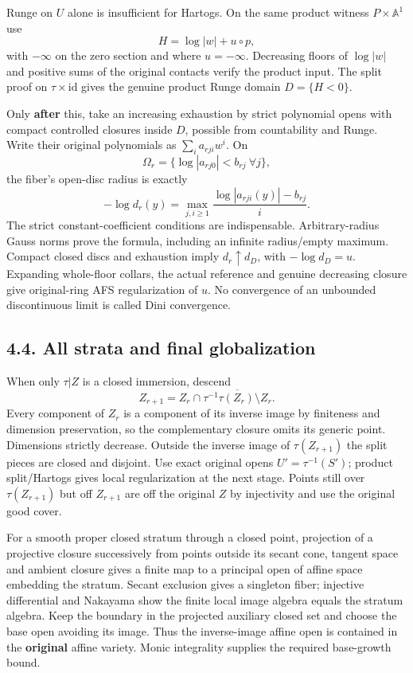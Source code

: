 \documentclass[
  10pt,
]{article}
\begin{document}
Runge on \(U\) alone is insufficient for Hartogs. On the same product
witness \(P\times\mathbb A^1\) use \[H=\log|w|+u\circ p,\] with
\(-\infty\) on the zero section and where \(u=-\infty\). Decreasing
floors of \(\log|w|\) and positive sums of the original contacts verify
the product input. The split proof on \(\tau\times\mathrm{id}\) gives
the genuine product Runge domain \(D=\{H<0\}\).

Only \textbf{after} this, take an increasing exhaustion by strict
polynomial opens with compact controlled closures inside \(D\), possible
from countability and Runge. Write their original polynomials as
\(\sum_i a_{rji}w^i\). On
\[\Omega_r=\{\log|a_{rj0}|<b_{rj}\ \forall j\},\] the fiber's open-disc
radius is exactly
\[-\log d_r(y)=\max_{j,i\ge1}\frac{\log|a_{rji}(y)|-b_{rj}}{i}.\] The
strict constant-coefficient conditions are indispensable.
Arbitrary-radius Gauss norms prove the formula, including an infinite
radius/empty maximum. Compact closed discs and exhaustion imply
\(d_r\uparrow d_D\), with \(-\log d_D=u\). Expanding whole-floor
collars, the actual reference and genuine decreasing closure give
original-ring AFS regularization of \(u\). No convergence of an
unbounded discontinuous limit is called Dini convergence.

\subsection{4.4. All strata and final
globalization}\label{all-strata-and-final-globalization}

When only \(\tau|Z\) is a closed immersion, descend
\[Z_{r+1}=Z_r\cap\overline{\tau^{-1}\tau(Z_r)\setminus Z_r}.\] Every
component of \(Z_r\) is a component of its inverse image by finiteness
and dimension preservation, so the complementary closure omits its
generic point. Dimensions strictly decrease. Outside the inverse image
of \(\tau(Z_{r+1})\) the split pieces are closed and disjoint. Use exact
original opens \(U'=\tau^{-1}(S')\); product split/Hartogs gives local
regularization at the next stage. Points still over \(\tau(Z_{r+1})\)
but off \(Z_{r+1}\) are off the original \(Z\) by injectivity and use
the original good cover.

For a smooth proper closed stratum through a closed point, projection of
a projective closure successively from points outside its secant cone,
tangent space and ambient closure gives a finite map to a principal open
of affine space embedding the stratum. Secant exclusion gives a
singleton fiber; injective differential and Nakayama show the finite
local image algebra equals the stratum algebra. Keep the boundary in the
projected auxiliary closed set and choose the base open avoiding its
image. Thus the inverse-image affine open is contained in the
\textbf{original} affine variety. Monic integrality supplies the
required base-growth bound.
\end{document}
